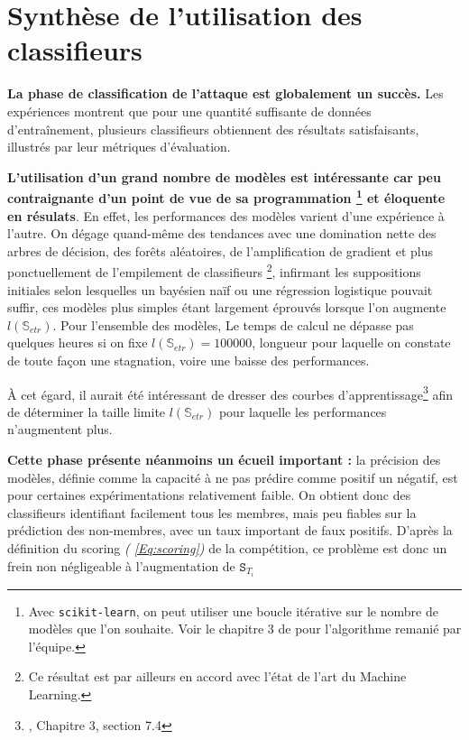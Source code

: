     \section{Synthèse de l'utilisation des classifieurs}

    \textbf{La phase de classification de l'attaque est globalement un succès.} Les expériences
    montrent que pour une quantité suffisante de données d'entraînement, plusieurs classifieurs
    obtiennent des résultats satisfaisants, illustrés par leur métriques d'évaluation.

    \textbf{L'utilisation d'un grand nombre de modèles est intéressante car peu
    contraignante d'un point de vue de sa programmation
    \footnote{Avec \texttt{scikit-learn}, on peut utiliser une boucle itérative sur le nombre de modèles que l'on souhaite. Voir le chapitre 3 de \cite{MLFondamentaux} pour l'algorithme remanié par l'équipe.}
    et éloquente en résulats}. En effet, les performances des modèles varient d'une expérience à
    l'autre. On dégage quand-même des tendances avec une domination nette des arbres de décision,
    des forêts aléatoires, de l'amplification de gradient et plus ponctuellement de l'empilement
    de classifieurs
    \footnote{Ce résultat est par ailleurs en accord avec l'état de l'art du Machine Learning.},
    infirmant les suppositions initiales selon lesquelles un bayésien naïf ou une régression
    logistique pouvait suffir, ces modèles plus simples étant largement éprouvés lorsque l'on
    augmente $l\left(\mathbb{S}_{etr}\right)$. Pour l'ensemble des modèles, Le temps de calcul ne
    dépasse pas quelques heures si on fixe $l\left(\mathbb{S}_{etr}\right)=100000$,
    longueur pour laquelle on constate de toute façon une stagnation, voire une baisse des performances.

    À cet égard, il aurait été intéressant de dresser des courbes d'apprentissage\footnote{
    \cite{MLFondamentaux}, Chapitre 3, section 7.4} afin de déterminer la taille limite
    $l\left(\mathbb{S}_{etr}\right)$ pour laquelle les performances n'augmentent plus.

    \begin{tcolorbox}[colback=linkborder_Color!5!white,colframe=linkborder_Color!75!black]
        \textbf{Cette phase présente néanmoins un écueil important :} la précision des modèles,
        définie comme la capacité à ne pas prédire comme positif un négatif, est pour certaines
        expérimentations relativement faible. On obtient donc des classifieurs identifiant
        facilement tous les membres, mais peu fiables sur la prédiction des non-membres, avec un
        taux important de faux positifs. D'après la définition du scoring \textit{(
            \ref{Eq:scoring})} de la compétition, ce problème est donc un frein non négligeable
        à l'augmentation de $\mathtt S_{T_i}$
    \end{tcolorbox}
